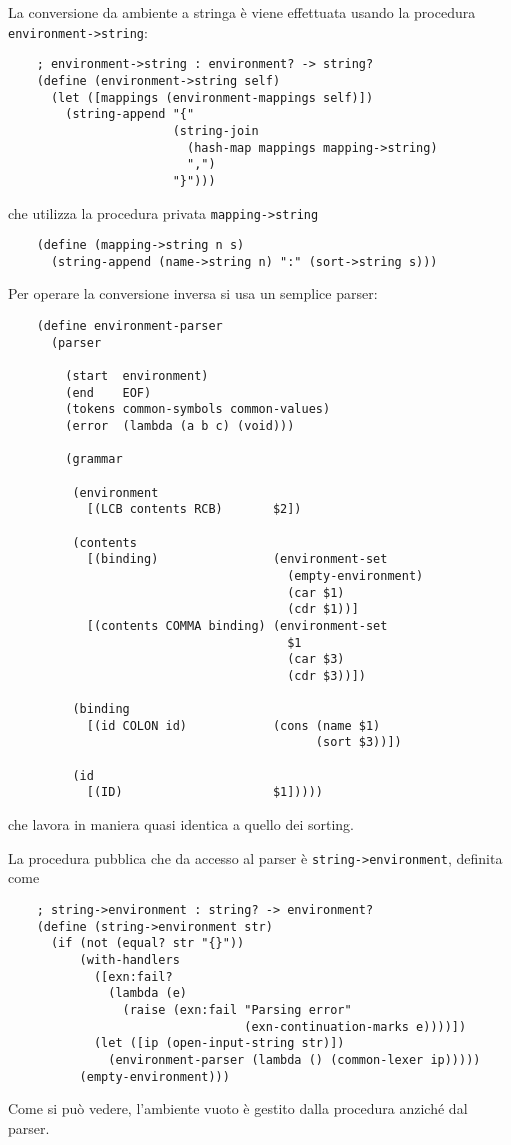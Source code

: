 La conversione da ambiente a stringa \`e viene effettuata usando la
procedura \lstinline{environment->string}:

\begin{lstlisting}
    ; environment->string : environment? -> string?
    (define (environment->string self)
      (let ([mappings (environment-mappings self)])
        (string-append "{"
                       (string-join
                         (hash-map mappings mapping->string)
                         ",")
                       "}")))

\end{lstlisting}

che utilizza la procedura privata \lstinline{mapping->string}

\begin{lstlisting}
    (define (mapping->string n s)
      (string-append (name->string n) ":" (sort->string s)))
\end{lstlisting}

Per operare la conversione inversa si usa un semplice parser:

\begin{lstlisting}
    (define environment-parser
      (parser

        (start  environment)
        (end    EOF)
        (tokens common-symbols common-values)
        (error  (lambda (a b c) (void)))

        (grammar

         (environment
           [(LCB contents RCB)       $2])

         (contents
           [(binding)                (environment-set
                                       (empty-environment)
                                       (car $1)
                                       (cdr $1))]
           [(contents COMMA binding) (environment-set
                                       $1
                                       (car $3)
                                       (cdr $3))])

         (binding
           [(id COLON id)            (cons (name $1)
                                           (sort $3))])

         (id
           [(ID)                     $1]))))
\end{lstlisting}

che lavora in maniera quasi identica a quello dei sorting.

La procedura pubblica che da accesso al parser \`e
\lstinline{string->environment}, definita come

\begin{lstlisting}
    ; string->environment : string? -> environment?
    (define (string->environment str)
      (if (not (equal? str "{}"))
          (with-handlers
            ([exn:fail?
              (lambda (e)
                (raise (exn:fail "Parsing error"
                                 (exn-continuation-marks e))))])
            (let ([ip (open-input-string str)])
              (environment-parser (lambda () (common-lexer ip)))))
          (empty-environment)))
\end{lstlisting}

Come si pu\`o vedere, l'ambiente vuoto \`e gestito dalla procedura
anzich\'e dal parser.
